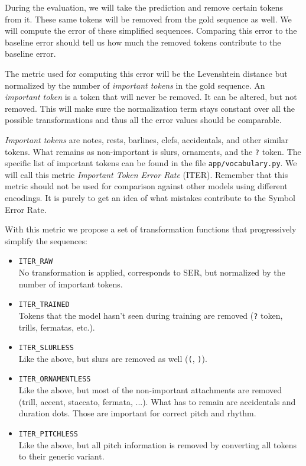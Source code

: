 During the evaluation, we will take the prediction and remove certain tokens from it. These same tokens will be removed from the gold sequence as well. We will compute the error of these simplified sequences. Comparing this error to the baseline error should tell us how much the removed tokens contribute to the baseline error.

The metric used for computing this error will be the Levenshtein distance but normalized by the number of \emph{important tokens} in the gold sequence. An \emph{important token} is a token that will never be removed. It can be altered, but not removed. This will make sure the normalization term stays constant over all the possible transformations and thus all the error values should be comparable.

\emph{Important tokens} are notes, rests, barlines, clefs, accidentals, and other similar tokens. What remains as non-important is slurs, ornaments, and the \verb`?` token. The specific list of important tokens can be found in the file \verb`app/`\allowbreak\verb`voca`\allowbreak\verb`bula`\allowbreak\verb`ry.py`. We will call this metric \emph{Important Token Error Rate} (ITER). Remember that this metric should not be used for comparison against other models using different encodings. It is purely to get an idea of what mistakes contribute to the Symbol Error Rate.

With this metric we propose a set of transformation functions that progressively simplify the sequences:

\begin{itemize}
\item \verb`ITER_RAW` \\ No transformation is applied, corresponds to SER, but normalized by the number of important tokens.
\item \verb`ITER_TRAINED` \\ Tokens that the model hasn't seen during training are removed (\verb`?` token, trills, fermatas, etc.).
\item \verb`ITER_SLURLESS` \\ Like the above, but slurs are removed as well (\verb`(`, \verb`)`).
\item \verb`ITER_ORNAMENTLESS` \\ Like the above, but most of the non-important attachments are removed (trill, accent, staccato, fermata, ...). What has to remain are accidentals and duration dots. Those are important for correct pitch and rhythm.
\item \verb`ITER_PITCHLESS` \\ Like the above, but all pitch information is removed by converting all tokens to their generic variant.
\end{itemize}

